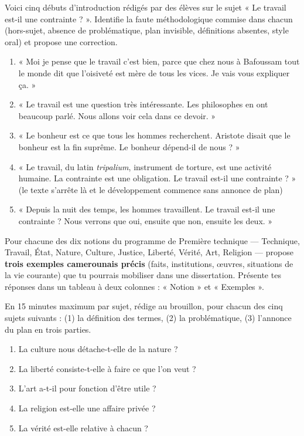 \documentclass[11pt]{article}
\newcommand{\cle}[1]{{\popxbold\color{popdark}#1}}
\newcounter{popsec}
\newcounter{popsub}
\newcommand{\courssub}[1]{%
  \stepcounter{popsub}%
  \par\vspace{9pt}\noindent{\popxbold\fontsize{11.5}{13}\selectfont\color{popink}{\color{poporange}\thepopsec.\thepopsub}\hspace{6pt}#1}\par\nopagebreak\vspace{4pt}
}
\begin{document}
\courssub{Je m'entraîne}

\begin{exercice}
Voici cinq débuts d'introduction rédigés par des élèves sur le sujet « Le travail est-il une contrainte ? ». Identifie la faute méthodologique commise dans chacun (hors-sujet, absence de problématique, plan invisible, définitions absentes, style oral) et propose une correction.
\begin{enumerate}
\item « Moi je pense que le travail c'est bien, parce que chez nous à Bafoussam tout le monde dit que l'oisiveté est mère de tous les vices. Je vais vous expliquer ça. »
\item « Le travail est une question très intéressante. Les philosophes en ont beaucoup parlé. Nous allons voir cela dans ce devoir. »
\item « Le bonheur est ce que tous les hommes recherchent. Aristote disait que le bonheur est la fin suprême. Le bonheur dépend-il de nous ? »
\item « Le travail, du latin \emph{tripalium}, instrument de torture, est une activité humaine. La contrainte est une obligation. Le travail est-il une contrainte ? » (le texte s'arrête là et le développement commence sans annonce de plan)
\item « Depuis la nuit des temps, les hommes travaillent. Le travail est-il une contrainte ? Nous verrons que oui, ensuite que non, ensuite les deux. »
\end{enumerate}
\end{exercice}

\begin{exercice}
Pour chacune des dix notions du programme de Première technique — \cle{Technique}, \cle{Travail}, \cle{État}, \cle{Nature}, \cle{Culture}, \cle{Justice}, \cle{Liberté}, \cle{Vérité}, \cle{Art}, \cle{Religion} — propose \textbf{trois exemples camerounais précis} (faits, institutions, œuvres, situations de la vie courante) que tu pourrais mobiliser dans une dissertation. Présente tes réponses dans un tableau à deux colonnes : « Notion » et « Exemples ».
\end{exercice}

\begin{exercice}
En 15 minutes maximum par sujet, rédige au brouillon, pour chacun des cinq sujets suivants : (1) la définition des termes, (2) la problématique, (3) l'annonce du plan en trois parties.
\begin{enumerate}
\item La culture nous détache-t-elle de la nature ?
\item La liberté consiste-t-elle à faire ce que l'on veut ?
\item L'art a-t-il pour fonction d'être utile ?
\item La religion est-elle une affaire privée ?
\item La vérité est-elle relative à chacun ?
\end{enumerate}
\end{exercice}
\end{document}
